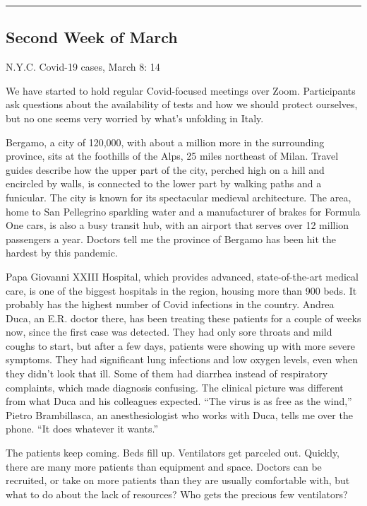 \begin{center}\rule{0.5\linewidth}{\linethickness}\end{center}

\hypertarget{second-week-of-march}{%
\subsection{Second Week of March}\label{second-week-of-march}}

N.Y.C. Covid-19 cases, March 8: 14

We have started to hold regular Covid-focused meetings over Zoom.
Participants ask questions about the availability of tests and how we
should protect ourselves, but no one seems very worried by what's
unfolding in Italy.

Bergamo, a city of 120,000, with about a million more in the surrounding
province, sits at the foothills of the Alps, 25 miles northeast of
Milan. Travel guides describe how the upper part of the city, perched
high on a hill and encircled by walls, is connected to the lower part by
walking paths and a funicular. The city is known for its spectacular
medieval architecture. The area, home to San Pellegrino sparkling water
and a manufacturer of brakes for Formula One cars, is also a busy
transit hub, with an airport that serves over 12 million passengers a
year. Doctors tell me the province of Bergamo has been hit the hardest
by this pandemic.

Papa Giovanni XXIII Hospital, which provides advanced, state-of-the-art
medical care, is one of the biggest hospitals in the region, housing
more than 900 beds. It probably has the highest number of Covid
infections in the country. Andrea Duca, an E.R. doctor there, has been
treating these patients for a couple of weeks now, since the first case
was detected. They had only sore throats and mild coughs to start, but
after a few days, patients were showing up with more severe symptoms.
They had significant lung infections and low oxygen levels, even when
they didn't look that ill. Some of them had diarrhea instead of
respiratory complaints, which made diagnosis confusing. The clinical
picture was different from what Duca and his colleagues expected. ``The
virus is as free as the wind,'' Pietro Brambillasca, an anesthesiologist
who works with Duca, tells me over the phone. ``It does whatever it
wants.''

The patients keep coming. Beds fill up. Ventilators get parceled out.
Quickly, there are many more patients than equipment and space. Doctors
can be recruited, or take on more patients than they are usually
comfortable with, but what to do about the lack of resources? Who gets
the precious few ventilators?

